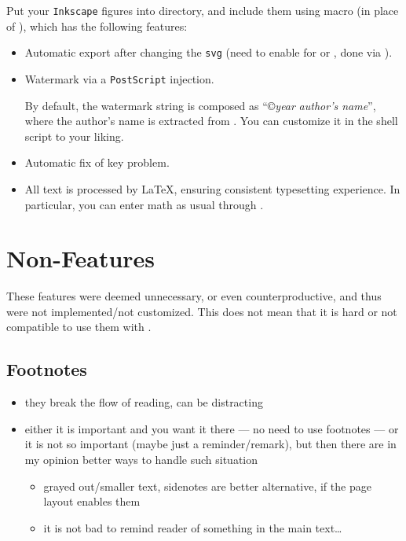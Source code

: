 Put your \texttt{Inkscape} figures into  directory, and include them using  macro (in place of ), which has the following features:
\begin{itemize}
    \item Automatic export after changing the \texttt{svg} (need to enable  for  or , done via ).
    \item Watermark via a \texttt{PostScript} injection.
          \begin{remark}
              By default, the watermark string is composed as \enquote{\copyright \textlangle\textit{year}\textrangle{} \textlangle\textit{author's name}\textrangle}, where the author's name is extracted from \custommacro{\ManualAuthorPlaintext}.
              You can customize it in the shell script  to your liking.
          \end{remark}
    \item Automatic fix of  key problem.
    \item All text is processed by \LaTeX{}, ensuring consistent typesetting experience.
          In particular, you can enter math as usual through .
\end{itemize}


\section{Non-Features}%
\label{sec:Non-Features}

These features were deemed unnecessary, or even counterproductive, and thus were not implemented/not customized.
This does not mean that it is hard or not compatible to use them with \TeXtured{}.

\subsection{Footnotes}%
\label{sub:Footnotes}

\begin{itemize}
    \item they break the flow of reading, can be distracting
    \item either it is important and you want it there --- no need to use footnotes --- or it is not so important (maybe just a reminder/remark), but then there are in my opinion better ways to handle such situation
          \begin{itemize}
              \item grayed out/smaller text, sidenotes are better alternative, if the page layout enables them
              \item it is not bad to remind reader of something in the main text\ldots
          \end{itemize}
\end{itemize}

